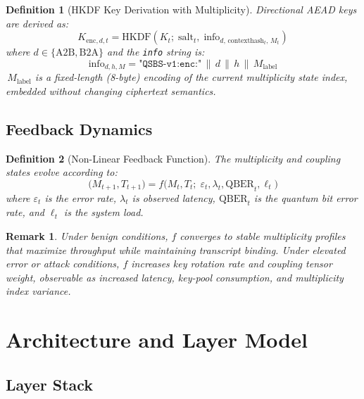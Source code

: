 \documentclass[11pt,letterpaper]{article}
\newtheorem{definition}{Definition}[section]
\newtheorem{remark}{Remark}[section]
\begin{document}
\begin{definition}[HKDF Key Derivation with Multiplicity]
Directional AEAD keys are derived as:
\[
  K_{\text{enc},d,t} = \text{HKDF}\!\left(K_t;\; \text{salt}_t,\;
    \text{info}_{d,\,\text{contexthash}_t,\,M_t}\right) \tag{12}
\]
where \(d \in \{\text{A2B}, \text{B2A}\}\) and the \texttt{info} string is:
\[
  \text{info}_{d,h,M} = \texttt{"QSBS-v1:enc:"} \,\|\, d \,\|\, h \,\|\, M_{\text{label}} \tag{13}
\]
\(\,M_{\text{label}}\) is a fixed-length (8-byte) encoding of the current multiplicity
state index, embedded without changing ciphertext semantics.
\end{definition}

\subsection{Feedback Dynamics}

\begin{definition}[Non-Linear Feedback Function]
The multiplicity and coupling states evolve according to:
\[
  \bigl(M_{t+1}, T_{t+1}\bigr) = f\!\bigl(M_t, T_t;\;
    \varepsilon_t, \lambda_t, \text{QBER}_t, \ell_t\bigr) \tag{14}
\]
where \(\varepsilon_t\) is the error rate, \(\lambda_t\) is observed latency,
\(\text{QBER}_t\) is the quantum bit error rate, and \(\ell_t\) is the system load.
\end{definition}

\begin{remark}
Under benign conditions, \(f\) converges to stable multiplicity profiles that
maximize throughput while maintaining transcript binding. Under elevated error or
attack conditions, \(f\) increases key rotation rate and coupling tensor weight,
observable as increased latency, key-pool consumption, and multiplicity index
variance.
\end{remark}

\section{Architecture and Layer Model}

\subsection{Layer Stack}
\end{document}
